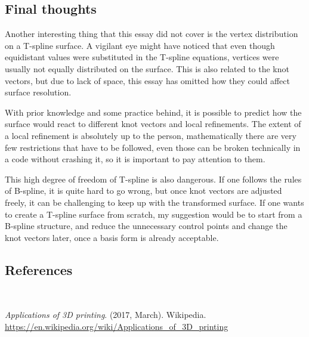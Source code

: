 \documentclass{article}
\begin{document}
\begin{large}
\section{Final thoughts}
\end{large}

\vspace{12pt}

Another interesting thing that this essay did not cover is the vertex distribution on a T-spline surface. A vigilant eye might have noticed that even though equidistant values were substituted in the T-spline equations, vertices were usually not equally distributed on the surface. This is also related to the knot vectors, but due to lack of space, this essay has omitted how they could affect surface resolution.

\vspace{6pt}

With prior knowledge and some practice behind, it is possible to predict how the surface would react to different knot vectors and local refinements. The extent of a local refinement is absolutely up to the person, mathematically there are very few restrictions that have to be followed, even those can be broken technically in a code without crashing it, so it is important to pay attention to them.

This high degree of freedom of T-spline is also dangerous. If one follows the rules of B-spline, it is quite hard to go wrong, but once knot vectors are adjusted freely, it can be challenging to keep up with the transformed surface. If one wants to create a T-spline surface from scratch, my suggestion would be to start from a B-spline structure, and reduce the unnecessary control points and change the knot vectors later, once a basis form is already acceptable.

\vspace{12pt}

\begin{large}
\section{References}
\end{large}

\vspace{12pt}

$\phantom{w}$

\emph{Applications of 3D printing}. (2017, March). Wikipedia. \url{https://en.wikipedia.org/wiki/Applications_of_3D_printing}
\end{document}
